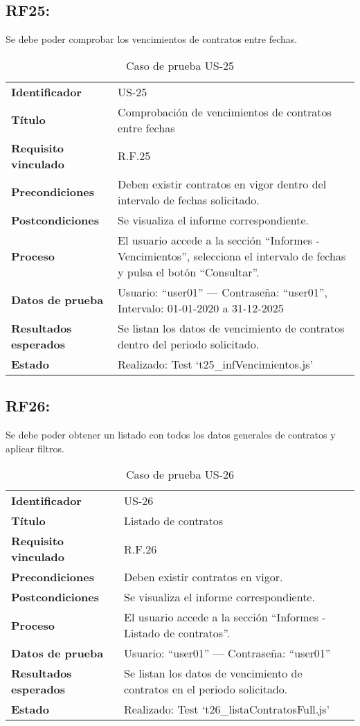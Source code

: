 \subsection*{RF25:} Se debe poder comprobar los vencimientos de contratos entre fechas.
\begin{table}[H]
	\centering
	\small
	\caption{Caso de prueba US-25}
	\label{tab:caso_uso25}
	\begin{tabular}{>{\bfseries}l p{11cm}}
		Identificador & US-25 \\
		Título & Comprobación de vencimientos de contratos entre fechas \\
		Requisito vinculado & R.F.25 \\
		Precondiciones & Deben existir contratos en vigor dentro del intervalo de fechas solicitado. \\
		Postcondiciones & Se visualiza el informe correspondiente. \\
		Proceso & El usuario accede a la sección “Informes - Vencimientos”, selecciona el intervalo de fechas y pulsa el botón “Consultar”. \\
		Datos de prueba & Usuario: “user01” — Contraseña: “user01”, Intervalo: 01-01-2020 a 31-12-2025 \\
		Resultados esperados & Se listan los datos de vencimiento de contratos dentro del periodo solicitado. \\
		Estado & Realizado: Test `t25\_infVencimientos.js' \\
	\end{tabular}
\end{table}

\subsection*{RF26:} Se debe poder obtener un listado con todos los datos generales de contratos y aplicar filtros.
\begin{table}[H]
	\centering
	\small
	\caption{Caso de prueba US-26}
	\label{tab:caso_uso26}
	\begin{tabular}{>{\bfseries}l p{11cm}}
		Identificador & US-26 \\
		Título & Listado de contratos \\
		Requisito vinculado & R.F.26 \\
		Precondiciones & Deben existir contratos en vigor. \\
		Postcondiciones & Se visualiza el informe correspondiente. \\
		Proceso & El usuario accede a la sección “Informes - Listado de contratos”. \\
		Datos de prueba & Usuario: “user01” — Contraseña: “user01” \\
		Resultados esperados & Se listan los datos de vencimiento de contratos en el periodo solicitado. \\
		Estado & Realizado: Test `t26\_listaContratosFull.js' \\
	\end{tabular}
\end{table}

